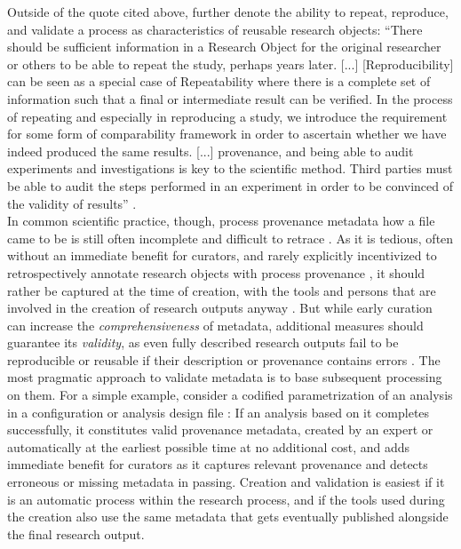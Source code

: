 Outside of the quote cited above, \citet{bechhofer2010research} further denote the ability to repeat, reproduce, and validate a process as characteristics of reusable research objects:
``There should be sufficient information in a Research Object for the original researcher or others to be able to repeat the study, perhaps years later.
[...]
[Reproducibility] can be seen as a special case of Repeatability where there is a complete set of information such that a final or intermediate result can be verified.
In the process of repeating and especially in reproducing a study, we introduce the requirement for some form of comparability framework in order to ascertain whether we have indeed produced the same results.
[...] provenance, and being able to audit experiments and investigations is key to the scientific method.
Third parties must be able to audit the steps performed in an experiment in order to be convinced of the validity of results'' \citet{bechhofer2010research}.\\
In common scientific practice, though, process provenance metadata how a file came to be is still often incomplete and difficult to retrace \citep{hardwicke2018data}.
As it is tedious, often without an immediate benefit for curators, and rarely explicitly incentivized to retrospectively annotate research objects with process provenance \citep{edwards2011science, san2009long}, it should rather be captured at the time of creation, with the tools and persons that are involved in the creation of research outputs anyway \citep{dallas2016digital}.
But while early curation can increase the \textit{comprehensiveness} of metadata, additional measures should guarantee its \textit{validity}, as even fully described research outputs fail to be reproducible or reusable if their description or provenance contains errors \citep[see, e.g.,][]{manninen2017reproducibility}.
The most pragmatic approach to validate metadata is to base subsequent processing on them.
For a simple example, consider a codified parametrization of an analysis in a configuration or analysis design file  \citep[see, e.g.,][]{jas2018reproducible}:
If an analysis based on it completes successfully, it constitutes valid provenance metadata, created by an expert or automatically at the earliest possible time at no additional cost, and adds immediate benefit for curators as it captures relevant provenance and detects erroneous or missing metadata in passing.
Creation and validation is easiest if it is an automatic process within the research process, and if the tools used during the creation also use the same metadata that gets eventually published alongside the final research output.
